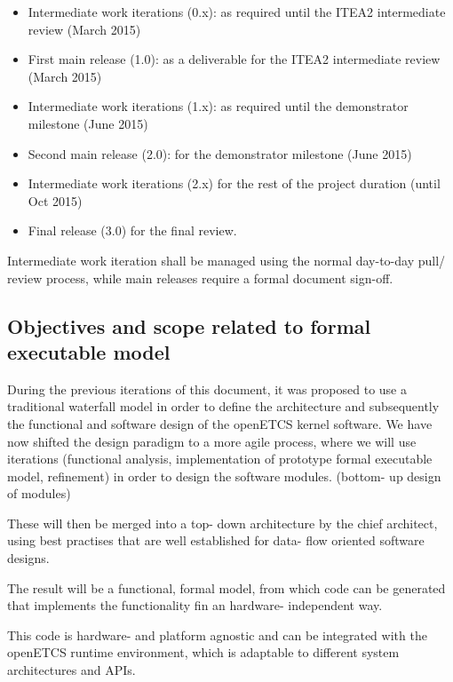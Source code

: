 \begin{itemize}
\item Intermediate work iterations (0.x): as required until the ITEA2 intermediate review (March 2015)

\item First main release (1.0): as a deliverable for the ITEA2 intermediate review (March 2015)

\item Intermediate work iterations (1.x): as required until the demonstrator milestone (June 2015)

\item Second main release (2.0): for the demonstrator milestone (June 2015)

\item Intermediate work iterations (2.x) for the rest of the project duration (until Oct 2015)

\item  Final release (3.0) for the final review.
\end{itemize}

Intermediate work iteration shall be managed using the normal day-to-day pull/ review process, while main releases require a formal document sign-off.


\subsection{Objectives and scope related to formal executable model}

During the previous iterations of this document, it was proposed to use a traditional waterfall model in order to define the architecture and subsequently the functional and software design of the openETCS kernel software. We have now shifted the design paradigm to a more agile process, where we will use iterations (functional analysis, implementation of prototype formal executable model, refinement) in order to design the software modules. (bottom- up design of modules)

These will then be merged into a top- down architecture by the chief architect, using best practises that are well established for data- flow oriented software designs.

The result will be a functional, formal model, from which code can be generated that implements the functionality fin an hardware- independent way.

This code is hardware- and platform agnostic and can be integrated with the openETCS runtime environment, which is adaptable to different system architectures and APIs.




